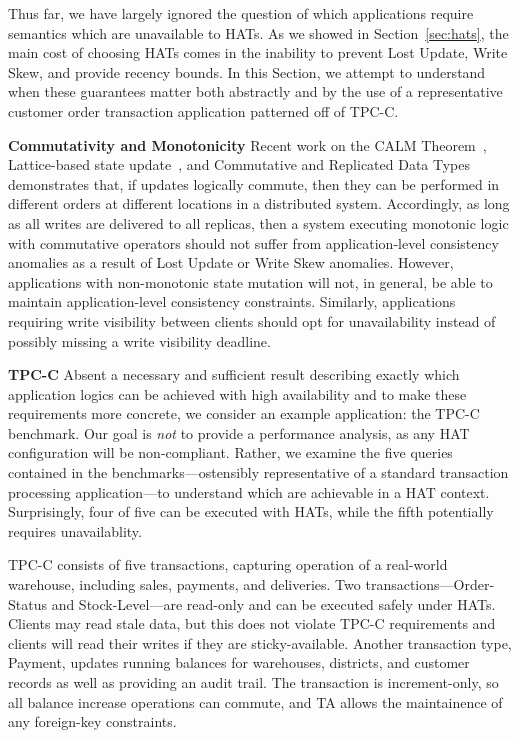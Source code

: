 Thus far, we have largely ignored the question of which applications
require semantics which are unavailable to HATs. As we showed in
Section~\ref{sec:hats}, the main cost of choosing HATs comes in the
inability to prevent Lost Update, Write Skew, and provide recency
bounds. In this Section, we attempt to understand when these
guarantees matter both abstractly and by the use of a representative
customer order transaction application patterned off of TPC-C.

\vspace{.5em}\noindent\textbf{Commutativity and Monotonicity} Recent work on
the CALM Theorem~\cite{calm}, Lattice-based state
update~\cite{blooml}, and Commutative and Replicated Data
Types~\cite{crdt} demonstrates that, if updates logically commute,
then they can be performed in different orders at different locations
in a distributed system. Accordingly, as long as all writes are
delivered to all replicas, then a system executing monotonic logic
with commutative operators should not suffer from application-level
consistency anomalies as a result of Lost Update or Write Skew
anomalies. However, applications with non-monotonic state mutation
will not, in general, be able to maintain application-level
consistency constraints. Similarly, applications requiring write
visibility between clients should opt for unavailability instead of
possibly missing a write visibility deadline.

\vspace{.5em}\noindent\textbf{TPC-C} Absent a necessary and sufficient
result describing exactly which application logics can be achieved
with high availability and to make these requirements more concrete,
we consider an example application: the TPC-C benchmark. Our goal is
\textit{not} to provide a performance analysis, as any HAT
configuration will be non-compliant. Rather, we examine the five
queries contained in the benchmarks---ostensibly representative of a
standard transaction processing application---to understand which are
achievable in a HAT context. Surprisingly, four of five can be
executed with HATs, while the fifth potentially requires unavailablity.

TPC-C consists of five transactions, capturing operation of a
real-world warehouse, including sales, payments, and deliveries. Two
transactions---Order-Status and Stock-Level---are read-only and can be
executed safely under HATs. Clients may read stale data, but this does
not violate TPC-C requirements and clients will read their writes if
they are sticky-available. Another transaction type, Payment, updates
running balances for warehouses, districts, and customer records as
well as providing an audit trail. The transaction is increment-only,
so all balance increase operations can commute, and TA allows the
maintainence of any foreign-key constraints.

